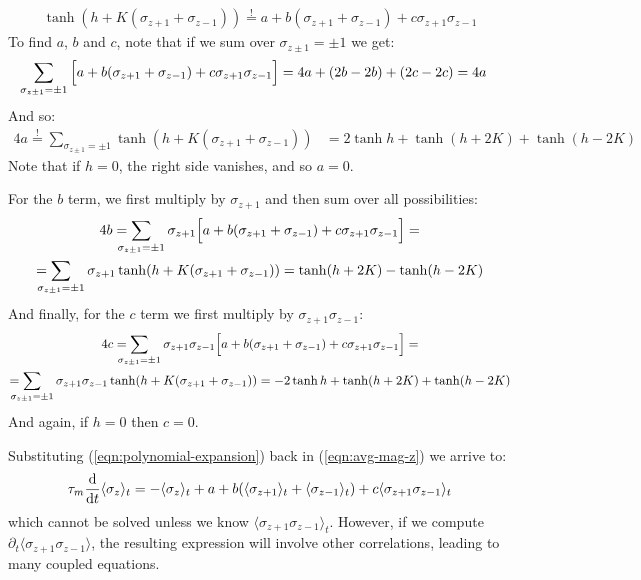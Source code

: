\documentclass[../../main.tex]{subfiles}
\begin{document}
\begin{align}\label{eqn:polynomial-expansion}
    \tanh(h + K(\sigma_{z+1} + \sigma_{z-1})) \overset{!}{=}  a + b(\sigma_{z+1} + \sigma_{z-1}) + c \sigma_{z+1} \sigma_{z-1}
\end{align}
To find $a$, $b$ and $c$, note that if we sum over $\sigma_{z\pm 1} = \pm 1$ we get:
\begin{align*}
    \sum_{\mathclap{\sigma_{z\pm1} = \pm 1}}\quad \Big[ a + b(\sigma_{z+1} + \sigma_{z-1}) + c \sigma_{z+1} \sigma_{z-1} \Big] = 4a + (2b -2b) + (2c - 2c) = 4a
\end{align*}
And so:
\begin{align*}
    4a \overset{!}{=} \sum_{\sigma_{z\pm 1} = \pm 1} \tanh(h + K(\sigma_{z+1} + \sigma_{z-1})) &= 2 \tanh h + \tanh (h + 2K) + \tanh(h - 2K) 
\end{align*}
Note that if $h=0$, the right side vanishes, and so $a=0$.

\medskip

For the $b$ term, we first multiply by $\sigma_{z+1}$ and then sum over all possibilities:
\begin{align*} 
    4b = \sum_{\mathclap{\sigma_{z\pm1} = \pm 1}} \quad \sigma_{z+1}\Big[ a + b(\sigma_{z+1} + \sigma_{z-1}) + c \sigma_{z+1} \sigma_{z-1} \Big] = \span\\
    = \sum_{\mathclap{\sigma_{z\pm1} = \pm 1}} \quad \sigma_{z+1}\tanh(h + K(\sigma_{z+1} + \sigma_{z-1})) = \tanh(h + 2K) - \tanh(h - 2K) \span
\end{align*}
And finally, for the $c$ term we first multiply by $\sigma_{z+1} \sigma_{z-1}$:
\begin{align*} 
    4c = \sum_{\mathclap{\sigma_{z\pm1} = \pm 1}} \quad \sigma_{z+1} \sigma_{z-1}\Big[ a + b(\sigma_{z+1} + \sigma_{z-1}) + c \sigma_{z+1} \sigma_{z-1} \Big] = \span\\
    = \sum_{\mathclap{\sigma_{z\pm1} = \pm 1}} \quad \sigma_{z+1} \sigma_{z-1}\tanh(h + K(\sigma_{z+1} + \sigma_{z-1})) = -2 \tanh h + \tanh (h + 2K) + \tanh (h-2K) \span
\end{align*}
And again, if $h=0$ then $c=0$.

\medskip

Substituting (\ref{eqn:polynomial-expansion}) back in (\ref{eqn:avg-mag-z}) we arrive to:
\begin{align}\label{eqn:magnetization-evolution}
    \tau_m \dv{t} \langle \sigma_z \rangle_t = -\langle \sigma_z \rangle_t + a+ b(\langle \sigma_{z+1} \rangle_t + \langle \sigma_{z-1} \rangle_t) + c \langle \sigma_{z+1} \sigma_{z-1} \rangle_t
\end{align}
which cannot be solved unless we know $\langle \sigma_{z+1} \sigma_{z-1} \rangle_t$. However, if we compute $\partial_t \langle \sigma_{z+1} \sigma_{z-1} \rangle$, the resulting expression will involve other correlations, leading to many coupled equations.
\end{document}
